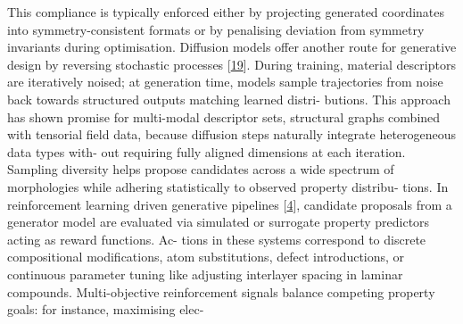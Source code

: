 \documentclass[
]{article}
\begin{document}
This compliance is typically enforced either by projecting generated
coordinates into symmetry-consistent formats or by penalising deviation
from symmetry invariants during optimisation. Diffusion models offer
another route for generative design by reversing stochastic processes
{[}\protect\hyperlink{_bookmark59}{19}{]}. During training, material
descriptors are iteratively noised; at generation time, models sample
trajectories from noise back towards structured outputs matching learned
distri- butions. This approach has shown promise for multi-modal
descriptor sets, structural graphs combined with tensorial field data,
because diffusion steps naturally integrate heterogeneous data types
with- out requiring fully aligned dimensions at each iteration. Sampling
diversity helps propose candidates across a wide spectrum of
morphologies while adhering statistically to observed property distribu-
tions. In reinforcement learning driven generative pipelines
{[}\protect\hyperlink{_bookmark44}{4}{]}, candidate proposals from a
generator model are evaluated via simulated or surrogate property
predictors acting as reward functions. Ac- tions in these systems
correspond to discrete compositional modifications, atom substitutions,
defect introductions, or continuous parameter tuning like adjusting
interlayer spacing in laminar compounds. Multi-objective reinforcement
signals balance competing property goals: for instance, maximising elec-
\end{document}
